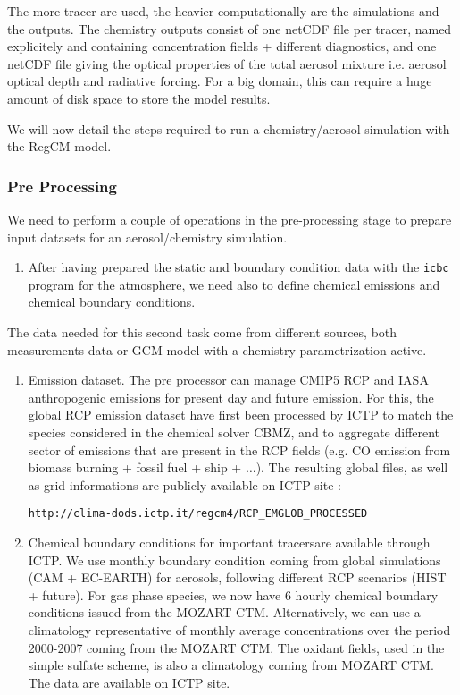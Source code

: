 The more tracer are used, the heavier computationally are the simulations and
the outputs. The chemistry outputs consist of one netCDF file per tracer,
named explicitely and containing concentration fields + different diagnostics,
and one netCDF file giving the optical properties of the total aerosol mixture
i.e. aerosol optical depth and radiative forcing. For a big domain, this can
require a huge amount of disk space to store the model results.

We will now detail the steps required to run a chemistry/aerosol simulation with
the RegCM model.

\subsubsection{Pre Processing}

We need to perform a couple of operations in the pre-processing stage to prepare
input datasets for an aerosol/chemistry simulation.

\begin{enumerate}
  \item After having prepared the static and boundary condition data with the
    \verb=icbc= program for the atmosphere, we need also to define chemical
    emissions and chemical boundary conditions.
\end{enumerate}

The data needed for this second task come from different sources, both
measurements data or GCM model with a chemistry parametrization active.

\begin{enumerate}
  \item Emission dataset. The pre processor can manage CMIP5 RCP and IASA  anthropogenic
    emissions for present day and future emission. For this, the global RCP
    emission dataset have first been processed by ICTP
    to match the species considered in the chemical solver CBMZ, and to
    aggregate different sector of emissions that are present in the RCP fields
    (e.g. CO emission from biomass burning + fossil fuel + ship + $\ldots$).
    The resulting global files, as well as grid informations are publicly
    available on ICTP site :
    \begin{center}
    \verb=http://clima-dods.ictp.it/regcm4/RCP_EMGLOB_PROCESSED=
    \end{center}
    
  \item Chemical boundary conditions for important tracersare available through
    ICTP. We use monthly boundary condition coming from global simulations
    (CAM + EC-EARTH) for aerosols, following different RCP scenarios
    (HIST + future).
    For gas phase species, we now have 6 hourly chemical boundary 
    conditions issued from the MOZART CTM. 
    Alternatively, we can use  a climatology representative
    of monthly average concentrations over the period 2000-2007 coming from
    the MOZART CTM. 
    The oxidant fields, used in the simple
    sulfate scheme, is also a climatology coming from MOZART CTM.
    The data are available on ICTP site.
\end{enumerate}

